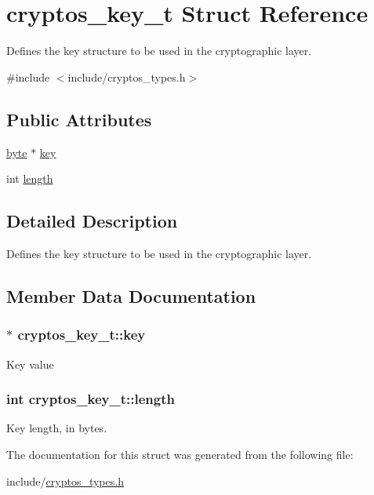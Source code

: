 \hypertarget{structcryptos__key__t}{
\section{cryptos\_\-key\_\-t Struct Reference}
\label{structcryptos__key__t}
}


Defines the key structure to be used in the cryptographic layer.  


{\ttfamily \#include $<$include/cryptos\_\-types.h$>$}\subsection*{Public Attributes}
\begin{DoxyCompactItemize}
\item 
\hyperlink{global__types_8h_a0c8186d9b9b7880309c27230bbb5e69d}{byte} $\ast$ \hyperlink{structcryptos__key__t_a3325e52356e26d855d16b15643f3ee9e}{key}
\item 
int \hyperlink{structcryptos__key__t_acc7767c208a13d70ff9ad83c7d53fe87}{length}
\end{DoxyCompactItemize}


\subsection{Detailed Description}
Defines the key structure to be used in the cryptographic layer. 

\subsection{Member Data Documentation}
\hypertarget{structcryptos__key__t_a3325e52356e26d855d16b15643f3ee9e}{
\subsubsection[{key}]{$\ast$ {\bf cryptos\_\-key\_\-t::key}}}
\label{structcryptos__key__t_a3325e52356e26d855d16b15643f3ee9e}
Key value \hypertarget{structcryptos__key__t_acc7767c208a13d70ff9ad83c7d53fe87}{
\subsubsection[{length}]{\setlength{\rightskip}{0pt plus 5cm}int {\bf cryptos\_\-key\_\-t::length}}}
\label{structcryptos__key__t_acc7767c208a13d70ff9ad83c7d53fe87}
Key length, in bytes. 

The documentation for this struct was generated from the following file:\begin{DoxyCompactItemize}
\item 
include/\hyperlink{cryptos__types_8h}{cryptos\_\-types.h}\end{DoxyCompactItemize}
